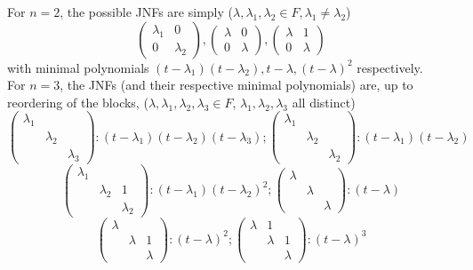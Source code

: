 \begin{example}
    For $n=2$, the possible JNFs are simply ($\lambda,\lambda_1,\lambda_2\in F,\lambda_1\neq\lambda_2$)
    $$\begin{pmatrix}
        \lambda_1&0\\
        0&\lambda_2
    \end{pmatrix},\begin{pmatrix}
        \lambda&0\\
        0&\lambda
    \end{pmatrix},\begin{pmatrix}
        \lambda&1\\
        0&\lambda
    \end{pmatrix}$$
    with minimal polynomials $(t-\lambda_1)(t-\lambda_2),t-\lambda,(t-\lambda)^2$ respectively.\\
    For $n=3$, the JNFs (and their respective minimal polynomials) are, up to reordering of the blocks, ($\lambda,\lambda_1,\lambda_2,\lambda_3\in F$, $\lambda_1,\lambda_2,\lambda_3$ all distinct)
    $$\begin{pmatrix}
        \lambda_1&&\\
        &\lambda_2&\\
        &&\lambda_3
    \end{pmatrix}:(t-\lambda_1)(t-\lambda_2)(t-\lambda_3);\begin{pmatrix}
        \lambda_1&&\\
        &\lambda_2&\\
        &&\lambda_2
    \end{pmatrix}:(t-\lambda_1)(t-\lambda_2)$$
    $$\begin{pmatrix}
        \lambda_1&&\\
        &\lambda_2&1\\
        &&\lambda_2
    \end{pmatrix}:(t-\lambda_1)(t-\lambda_2)^2;\begin{pmatrix}
        \lambda&&\\
        &\lambda&\\
        &&\lambda
    \end{pmatrix}:(t-\lambda)$$
    $$\begin{pmatrix}
        \lambda&&\\
        &\lambda&1\\
        &&\lambda
    \end{pmatrix}:(t-\lambda)^2;\begin{pmatrix}
        \lambda&1&\\
        &\lambda&1\\
        &&\lambda
    \end{pmatrix}:(t-\lambda)^3$$
\end{example}
